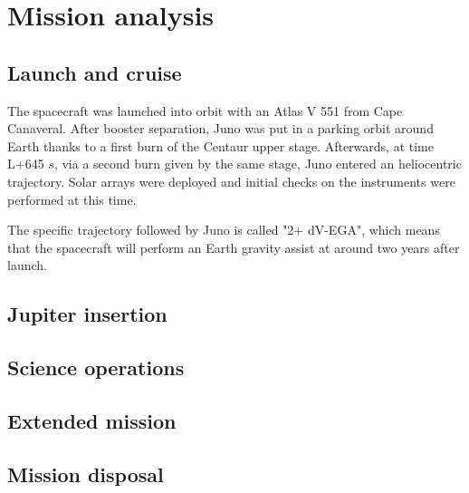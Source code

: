 \section{Mission analysis}
\label{sec:mission_analysis}

\subsection{Launch and cruise}
\label{sec: lancio e crociera}

The spacecraft was launched into orbit with an Atlas V 551 from Cape Canaveral. After booster separation, Juno was put in a parking orbit around Earth thanks to a first burn of the Centaur upper stage. Afterwards, at time L+645 $s$, via a second burn given by the same stage, Juno entered an heliocentric trajectory. Solar arrays were deployed and initial checks on the instruments were performed at this time.


The specific trajectory followed by Juno is called "2+ dV-EGA", which means that the spacecraft will perform an Earth gravity assist at around two years after launch.



\subsection{Jupiter insertion}
\label{sec: joi}

\subsection{Science operations}
\label{sec: science ops}

\subsection{Extended mission}
\label{sec: extended}

\subsection{Mission disposal}
\label{sec: disposal}

